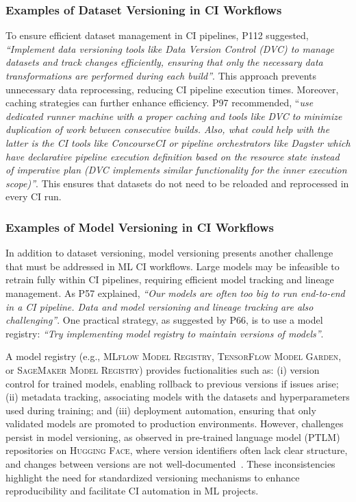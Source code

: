 \subsubsection*{Examples of Dataset Versioning in CI Workflows}

To ensure efficient dataset management in CI pipelines, P112 suggested, \textit{``Implement data versioning tools like Data Version Control (DVC) to manage datasets and track changes efficiently, ensuring that only the necessary data transformations are performed during each build''}. 
This approach prevents unnecessary data reprocessing, reducing CI pipeline execution times.
Moreover, caching strategies can further enhance efficiency. P97 recommended, ``\textit{use dedicated runner machine with a proper caching and tools like DVC to minimize duplication of work between consecutive builds. Also, what could help with the latter is the CI tools like ConcourseCI or pipeline orchestrators like Dagster which have declarative pipeline execution definition based on the resource state instead of imperative plan (DVC implements similar functionality for the inner execution scope)''}.
This ensures that datasets do not need to be reloaded and reprocessed in every CI run.

\subsubsection*{Examples of Model Versioning in CI Workflows}

In addition to dataset versioning, model versioning presents another challenge that must be addressed in ML CI workflows. Large models may be infeasible to retrain fully within CI pipelines, requiring efficient model tracking and lineage management. As P57 explained,
\textit{``Our models are often too big to run end-to-end in a CI pipeline. Data and model versioning and lineage tracking are also challenging''}. 
One practical strategy, as suggested by P66, is to use a model registry:
\textit{``Try implementing model registry to maintain versions of models''}.

A model registry (e.g., \textsc{MLflow Model Registry}, \textsc{TensorFlow Model Garden}, or \textsc{SageMaker Model Registry}) provides fuctionalities such as: (i) version control for trained models, enabling rollback to previous versions if issues arise; (ii) metadata tracking, associating models with the datasets and hyperparameters used during training; and (iii) deployment automation, ensuring that only validated models are promoted to production environments. 
However, challenges persist in model versioning, as observed in pre-trained language model (PTLM) repositories on \textsc{Hugging Face}, where version identifiers often lack clear structure, and changes between versions are not well-documented~\citep{ajibode2025semverPTLM}. These inconsistencies highlight the need for standardized versioning mechanisms to enhance reproducibility and facilitate CI automation in ML projects.

